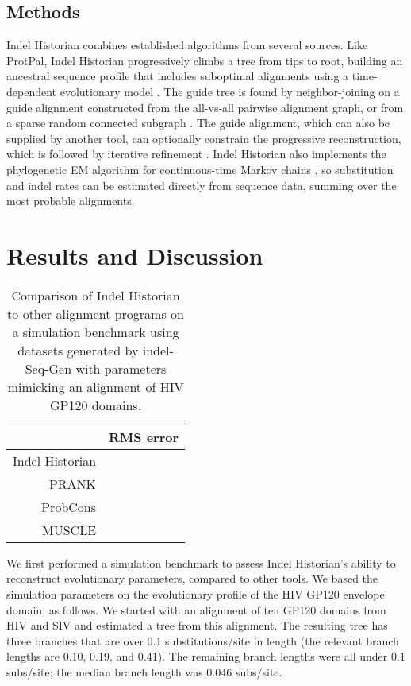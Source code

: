 \documentclass{bioinfo}
\begin{document}
\begin{methods}
\section{Methods}

Indel Historian combines established algorithms from several sources.
Like ProtPal, Indel Historian progressively climbs a tree from tips to root,
building an ancestral sequence profile that includes suboptimal alignments \citep{LeeGrassoSharlow2002,Westesson2012-zg}
using a time-dependent evolutionary model \citep{RivasEddy2015}.
The guide tree is found by neighbor-joining %
on a guide alignment constructed from the all-vs-all pairwise alignment graph,
or from a sparse random connected subgraph \citep{BradleyEtAl2009}.
The guide alignment, which can also be supplied by another tool,
can optionally constrain the progressive reconstruction,
which is followed by iterative refinement \citep{HolmesBruno2001,Edgar2004b}.
Indel Historian also implements the phylogenetic EM algorithm for continuous-time Markov chains \citep{HolmesRubin2002},
so substitution and indel rates can be estimated directly from sequence data,
summing over the most probable alignments.

\end{methods}

\section{Results and Discussion}

\begin{table}
  \begin{tabular}{r|r}
    & RMS error \\
    \hline
Indel Historian & \\
PRANK & \\
ProbCons & \\
MUSCLE & \\
  \end{tabular}
  \caption{
    Comparison of Indel Historian to other alignment programs on a simulation benchmark
    using datasets generated by indel-Seq-Gen \citep{StropeEtAl2009}
    with parameters mimicking an alignment of HIV GP120 domains.
  }
\end{table}

We first performed a simulation benchmark to assess Indel Historian's ability to reconstruct evolutionary parameters,
compared to other tools.
We based the simulation parameters on the evolutionary profile of the HIV GP120 envelope domain, as follows.
We started with an alignment of ten GP120 domains from HIV and SIV and estimated a tree from this alignment.
The resulting tree has three branches that are over 0.1 substitutions/site in length (the relevant branch lengths are 0.10, 0.19, and 0.41).
The remaining branch lengths were all under 0.1 subs/site; the median branch length was 0.046 subs/site.
\end{document}
